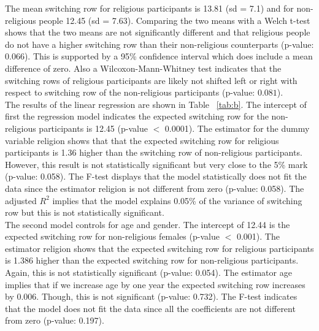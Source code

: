 \documentclass[10pt,a4paper]{article}
\begin{document}


The mean switching row for religious participants is 13.81 (sd = 7.1) and for non-religious people 12.45 (sd = 7.63). Comparing the two means with a Welch t-test shows that the two means are not significantly different and that religious people do not have a higher switching row than their non-religious counterparts (p-value: $0.066$). This is supported by a 95\% confidence interval which does include a mean difference of zero. Also a Wilcoxon-Mann-Whitney test indicates that the switching rows of religious participants are likely not shifted left or right with respect to switching row of the non-religious participants (p-value: $0.081$).\\ 

The results of the linear regression are shown in Table ~\ref{tab:b}. The intercept of first the regression model indicates the expected switching row for the non-religious participants is 12.45 (p-value $<$ 0.0001). The estimator for the dummy variable religion shows that that the expected switching row for religious participants is 1.36 higher than the switching row of non-religious participants. However, this result is not statistically significant but very close to the 5\% mark (p-value: 0.058). The F-test displays that the model statistically does not fit the data since the estimator religion is not different from zero (p-value: 0.058). The adjusted $R^2$ implies that the model explains 0.05\% of the variance of switching row but this is not statistically significant.\\


The second model controls for age and gender. The intercept of 12.44 is the expected switching row for non-religious females (p-value $<$ 0.001). The estimator religion shows that the expected switching row for religious participants is 1.386 higher than the expected switching row for non-religious participants. Again, this is not statistically significant (p-value: 0.054). The estimator age implies that if we increase age by one year the expected switching row increases by 0.006. Though, this is not significant (p-value: 0.732). The F-test indicates that the model does not fit the data since all the coefficients are not different from zero (p-value: 0.197).\\
\end{document}
